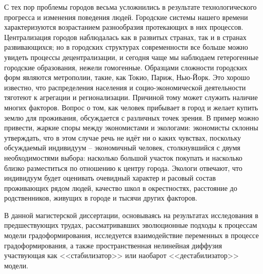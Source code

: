 С тех пор проблемы городов весьма усложнились в результате технологического прогресса и изменения поведения людей. Городские системы нашего времени характеризуются возрастанием разнообразия протекающих в них процессов. Централизация городов наблюдалась как в развитых странах, так и в странах развивающихся; но в городских структурах современности все больше можно увидеть процессы децентрализации, и сегодня чаще мы наблюдаем гетерогенные городские образования, нежели гомогенные. Образцами сложности городских форм являются метрополии, такие, как Токио, Париж, Нью-Йорк. Это хорошо известно, что распределения населения и социо-экономической деятельности тяготеют к агрегации и регионализации. Причиной тому может служить наличие многих факторов. Вопрос о том, как человек прибывает в город и желает купить землю для проживания, обсуждается с различных точек зрения. В пример можно привести, жаркие споры между экономистами и экологами: экономисты склонны утверждать, что в этом случае речь не идёт ни о каких чувствах, поскольку обсуждаемый индивидуум – экономичный человек, столкнувшийся с двумя необходимостями выбора: насколько большой участок покупать и насколько близко разместиться по отношению к центру города. Экологи отвечают, что индивидуум будет оценивать очевидный характер и расовый состав проживающих рядом людей, качество школ в окрестностях, расстояние до родственников, живущих в городе и тысячи других факторов. 

В данной магистерской диссертации, основываясь на результатах исследования в предшествующих трудах, рассматривавших эволюционные подходы к процессам модели градоформирования, исследуется взаимодействие переменных в процессе градоформирования, а также пространственная нелинейная диффузия участвующая как <<стабилизатор>> или наобарот <<дестабилизатор>> модели.
